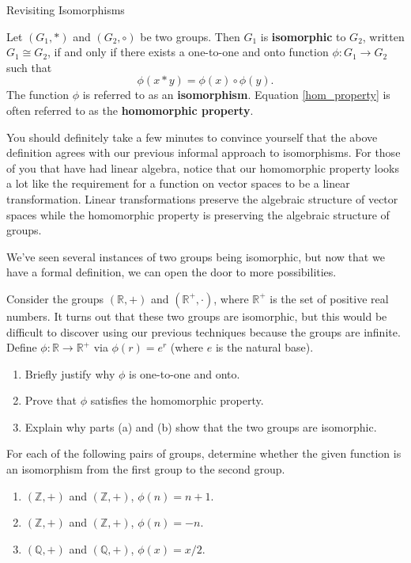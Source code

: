 \begin{section}{Revisiting Isomorphisms}
\begin{definition}\label{def:iso}
Let $(G_1,*)$ and $(G_2,\circ)$ be two groups.  Then $G_1$ is \textbf{isomorphic} to $G_2$, written $G_1\cong G_2$, if and only if there exists a one-to-one and onto function $\phi:G_1\to G_2$ such that
\begin{equation}\label{hom_property}
\phi(x*y)=\phi(x)\circ \phi(y).
\end{equation}
The function $\phi$ is referred to as an \textbf{isomorphism}.  Equation \ref{hom_property} is often referred to as the \textbf{homomorphic property}.
\end{definition}

You should definitely take a few minutes to convince yourself that the above definition agrees with our previous informal approach to isomorphisms.  For those of you that have had linear algebra, notice that our homomorphic property looks a lot like the requirement for a function on vector spaces to be a linear transformation.  Linear transformations preserve the algebraic structure of vector spaces while the homomorphic property is preserving the algebraic structure of groups.

We've seen several instances of two groups being isomorphic, but now that we have a formal definition, we can open the door to more possibilities.

\begin{problem}
Consider the groups $(\mathbb{R},+)$ and $(\mathbb{R}^+,\cdot)$, where $\mathbb{R}^+$ is the set of positive real numbers.  It turns out that these two groups are isomorphic, but this would be difficult to discover using our previous techniques because the groups are infinite.  Define $\phi:\mathbb{R}\to \mathbb{R}^+$ via $\phi(r)=e^r$ (where $e$ is the natural base).
\begin{enumerate}[label=\rm{(\alph*)}]
\item Briefly justify why $\phi$ is one-to-one and onto.
\item Prove that $\phi$ satisfies the homomorphic property.
\item Explain why parts (a) and (b) show that the two groups are isomorphic.
\end{enumerate}
\end{problem}

\begin{exercise}
For each of the following pairs of groups, determine whether the given function is an isomorphism from the first group to the second group.
\begin{enumerate}[label=\rm{(\alph*)}]
\item $(\mathbb{Z},+)$ and $(\mathbb{Z},+)$, $\phi(n)=n+1$.
\item $(\mathbb{Z},+)$ and $(\mathbb{Z},+)$, $\phi(n)=-n$.
\item $(\mathbb{Q},+)$ and $(\mathbb{Q},+)$, $\phi(x)=x/2$.
\end{enumerate}


\end{exercise}
\end{section}
